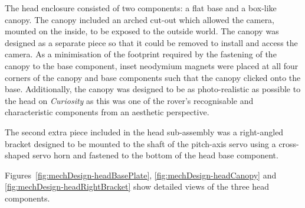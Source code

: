         The head enclosure consisted of two components: a flat base and a box-like canopy. The canopy included an arched cut-out which allowed the camera, mounted on the inside, to be exposed to the outside world. The canopy was designed as a separate piece so that it could be removed to install and access the camera. As a minimisation of the footprint required by the fastening of the canopy to the base component, inset neodymium magnets were placed at all four corners of the canopy and base components such that the canopy clicked onto the base. Additionally, the canopy was designed to be as photo-realistic as possible to the head on \textit{Curiosity} as this was one of the rover's recognisable and characteristic components from an aesthetic perspective.
        
        The second extra piece included in the head sub-assembly was a right-angled bracket designed to be mounted to the shaft of the pitch-axis servo using a cross-shaped servo horn and fastened to the bottom of the head base component.
        
        Figures~\ref{fig:mechDesign-headBasePlate}, \ref{fig:mechDesign-headCanopy} and \ref{fig:mechDesign-headRightBracket} show detailed views of the three head components.

